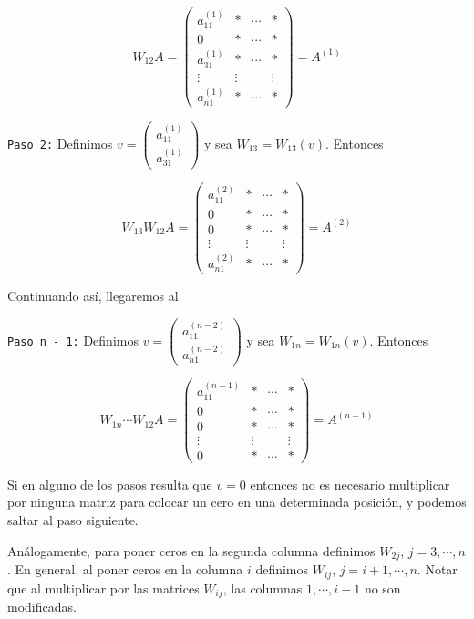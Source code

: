 \[W_{12}A = \begin{pmatrix}
a_{11}^{(1)} 	& * & \cdots & * \\
0				& * & \cdots & * \\
a_{31}^{(1)}		& * & \cdots & * \\
\vdots			& \vdots &  & \vdots \\
a_{n1}^{(1)}		& * & \cdots & *
\end{pmatrix} = A^{(1)}\]

\texttt{Paso 2:} Definimos $v = \begin{pmatrix}a_{11}^{(1)} \\ a_{31}^{(1)}\end{pmatrix}$ y sea $W_{13} = W_{13}(v)$. Entonces

\[W_{13}W_{12}A = \begin{pmatrix}
a_{11}^{(2)} 	& * & \cdots & * \\
0				& * & \cdots & * \\
0				& * & \cdots & * \\
\vdots			& \vdots &  & \vdots \\
a_{n1}^{(2)}		& * & \cdots & *
\end{pmatrix} = A^{(2)}\]

Continuando así, llegaremos al

\texttt{Paso n - 1:} Definimos $v = \begin{pmatrix}a_{11}^{(n - 2)} \\ a_{n1}^{(n - 2)}\end{pmatrix}$ y sea $W_{1n} = W_{1n}(v)$. Entonces

 \[W_{1n} \cdots W_{12}A = \begin{pmatrix}
a_{11}^{(n - 1)} 	& * & \cdots & * \\
0				& * & \cdots & * \\
0				& * & \cdots & * \\
\vdots			& \vdots &  & \vdots \\
0				& * & \cdots & *
\end{pmatrix} = A^{(n - 1)}\]

Si en alguno de los pasos resulta que $v = 0$ entonces no es necesario multiplicar por ninguna matriz para colocar un cero en una determinada posición, y podemos saltar al paso siguiente.

Análogamente, para poner ceros en la segunda columna definimos $W_{2j}$, $j = 3, \cdots, n$. En general, al poner ceros en la columna $i$ definimos $W_{ij}$, $j = i + 1, \cdots, n$. Notar que al multiplicar por las matrices $W_{ij}$, las columnas $1, \cdots, i - 1$ no son modificadas. 

